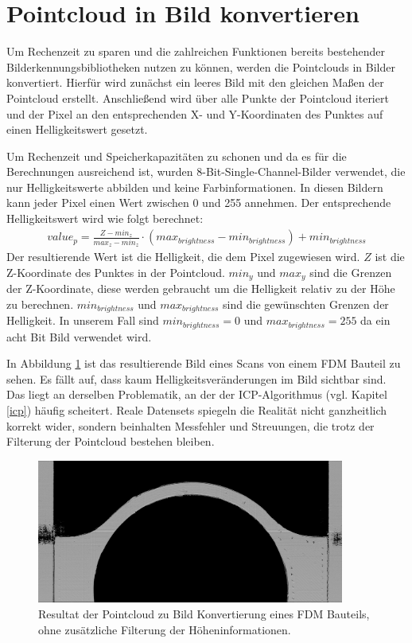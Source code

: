 \section{Pointcloud in Bild konvertieren}

Um Rechenzeit zu sparen und die zahlreichen Funktionen bereits bestehender
Bilderkennungsbibliotheken nutzen zu können, werden die Pointclouds in Bilder 
konvertiert. Hierfür wird zunächst ein leeres Bild mit den gleichen 
Maßen der Pointcloud erstellt. Anschließend wird über alle Punkte der
Pointcloud iteriert und der Pixel an den 
entsprechenden X- und Y-Koordinaten des Punktes auf einen Helligkeitswert gesetzt.

Um Rechenzeit und Speicherkapazitäten zu schonen und 
da es für die Berechnungen ausreichend ist, wurden 
8-Bit-Single-Channel-Bilder verwendet, die nur Helligkeitswerte abbilden und keine 
Farbinformationen.
In diesen Bildern kann jeder Pixel einen Wert zwischen 0 und 255 annehmen. 
Der entsprechende Helligkeitswert wird wie folgt berechnet:
\begin{align*}\label{calc:brightness}
    value_p = \frac{Z - min_z}{max_z - min_z} \cdot (max_{brightness} - min_{brightness}) + min_{brightness}
\end{align*}
Der resultierende Wert ist die Helligkeit, die dem Pixel zugewiesen wird.
$Z$ ist die Z-Koordinate des Punktes in der Pointcloud. $min_y$ und $max_y$ sind 
die Grenzen der Z-Koordinate, diese werden gebraucht um die Helligkeit relativ 
zu der Höhe zu berechnen. $min_{brightness}$ und $max_{brightness}$ sind die gewünschten Grenzen der 
Helligkeit. In unserem Fall sind $min_{brightness} = 0$ und $max_{brightness} = 255$ da ein acht Bit Bild
verwendet wird.

In Abbildung \ref{fig:image_from_pc} ist das resultierende Bild eines Scans von einem 
FDM Bauteil zu sehen. Es fällt auf, dass kaum Helligkeitsveränderungen
im Bild sichtbar sind. Das liegt an derselben Problematik, an der der ICP-Algorithmus
 (vgl. Kapitel \ref{icp}) häufig
scheitert. Reale Datensets spiegeln die Realität nicht ganzheitlich korrekt wider, 
sondern beinhalten Messfehler und Streuungen, die trotz der Filterung der Pointcloud
bestehen bleiben.

\begin{figure}[H]
    \centering
    \includegraphics[width=0.9\textwidth]{images/fdm_top_100p.png}
    \caption{Resultat der Pointcloud zu Bild Konvertierung eines FDM Bauteils, 
    ohne zusätzliche Filterung der Höheninformationen.}
    \label{fig:image_from_pc}
\end{figure}


